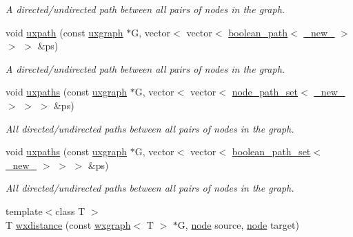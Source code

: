 \begin{DoxyCompactItemize}
\begin{DoxyCompactList}\small\item\em A directed/undirected path between all pairs of nodes in the graph. \end{DoxyCompactList}\item 
void \hyperlink{namespacelgraph_1_1traversal_a1f1940b51aef98c8b5be34aa3bc4a371}{uxpath} (const \hyperlink{classlgraph_1_1utils_1_1uxgraph}{uxgraph} $\ast$G, vector$<$ vector$<$ \hyperlink{classlgraph_1_1utils_1_1boolean__path}{boolean\+\_\+path}$<$ \hyperlink{namespacelgraph_1_1utils_a2c84bfde888c42ab3ad6b2cb8a364240}{\+\_\+new\+\_\+} $>$ $>$ $>$ \&ps)
\begin{DoxyCompactList}\small\item\em A directed/undirected path between all pairs of nodes in the graph. \end{DoxyCompactList}\item 
void \hyperlink{namespacelgraph_1_1traversal_a39a8bbdf96f484154d50e40f23021249}{uxpaths} (const \hyperlink{classlgraph_1_1utils_1_1uxgraph}{uxgraph} $\ast$G, vector$<$ vector$<$ \hyperlink{namespacelgraph_1_1utils_a723c115f9865edfab11a90377b9abef4}{node\+\_\+path\+\_\+set}$<$ \hyperlink{namespacelgraph_1_1utils_a2c84bfde888c42ab3ad6b2cb8a364240}{\+\_\+new\+\_\+} $>$ $>$ $>$ \&ps)
\begin{DoxyCompactList}\small\item\em All directed/undirected paths between all pairs of nodes in the graph. \end{DoxyCompactList}\item 
void \hyperlink{namespacelgraph_1_1traversal_a0e29db8163072d41c0dcc1b2e342d4bd}{uxpaths} (const \hyperlink{classlgraph_1_1utils_1_1uxgraph}{uxgraph} $\ast$G, vector$<$ vector$<$ \hyperlink{namespacelgraph_1_1utils_aaf50131e15d771a45620336d6e7a77f8}{boolean\+\_\+path\+\_\+set}$<$ \hyperlink{namespacelgraph_1_1utils_a2c84bfde888c42ab3ad6b2cb8a364240}{\+\_\+new\+\_\+} $>$ $>$ $>$ \&ps)
\begin{DoxyCompactList}\small\item\em All directed/undirected paths between all pairs of nodes in the graph. \end{DoxyCompactList}\item 
{\footnotesize template$<$class T $>$ }\\T \hyperlink{namespacelgraph_1_1traversal_a6f7355bc246be223e074d737810f2fb4}{wxdistance} (const \hyperlink{classlgraph_1_1utils_1_1wxgraph}{wxgraph}$<$ T $>$ $\ast$G, \hyperlink{namespacelgraph_1_1utils_a7bd66ede3805ef121bc2835bd48de0cf}{node} source, \hyperlink{namespacelgraph_1_1utils_a7bd66ede3805ef121bc2835bd48de0cf}{node} target)

\end{DoxyCompactItemize}
